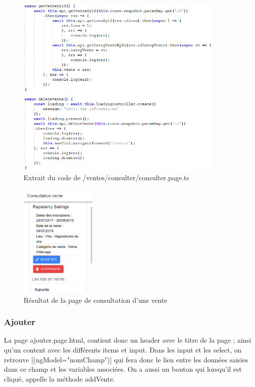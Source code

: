 			\begin{figure}[H]
				\centering\includegraphics[width=0.9\textwidth, keepaspectratio]{res/consulterTs.png}
				\caption{Extrait du code de /ventes/consulter/consulter.page.ts}
			\end{figure}

			\begin{figure}[H]
				\centering\includegraphics[width=0.33\textwidth, keepaspectratio]{res/consulterVente.png}
				\caption{Résultat de la page de consultation d'une vente}
			\end{figure}

			\subsubsection{Ajouter}
			La page ajouter.page.html, contient donc un header avec le titre de la page ; ainsi qu'un content avec les différents items et input. \newline
			Dans les input et les select, on retrouve [(ngModel="nomChamp")] qui fera donc le lien entre les données saisies dans ce champ et les variables associées.\newline
			On a aussi un bouton qui lorsqu'il est cliqué, appelle la méthode addVente.

